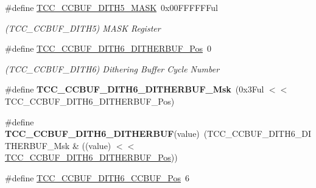 \begin{DoxyCompactItemize}
\item 
\hypertarget{group___s_a_m_l21___t_c_c_ga7bfedfc3944d42a6c27c8d35c3337223}{}\#define \hyperlink{group___s_a_m_l21___t_c_c_ga7bfedfc3944d42a6c27c8d35c3337223}{T\+C\+C\+\_\+\+C\+C\+B\+U\+F\+\_\+\+D\+I\+T\+H5\+\_\+\+M\+A\+S\+K}~0x00\+F\+F\+F\+F\+F\+Ful\label{group___s_a_m_l21___t_c_c_ga7bfedfc3944d42a6c27c8d35c3337223}

\begin{DoxyCompactList}\small\item\em (T\+C\+C\+\_\+\+C\+C\+B\+U\+F\+\_\+\+D\+I\+T\+H5) M\+A\+S\+K Register \end{DoxyCompactList}\item 
\hypertarget{group___s_a_m_l21___t_c_c_gaa0f9cd649bfec0986284ae7c3cbba40d}{}\#define \hyperlink{group___s_a_m_l21___t_c_c_gaa0f9cd649bfec0986284ae7c3cbba40d}{T\+C\+C\+\_\+\+C\+C\+B\+U\+F\+\_\+\+D\+I\+T\+H6\+\_\+\+D\+I\+T\+H\+E\+R\+B\+U\+F\+\_\+\+Pos}~0\label{group___s_a_m_l21___t_c_c_gaa0f9cd649bfec0986284ae7c3cbba40d}

\begin{DoxyCompactList}\small\item\em (T\+C\+C\+\_\+\+C\+C\+B\+U\+F\+\_\+\+D\+I\+T\+H6) Dithering Buffer Cycle Number \end{DoxyCompactList}\item 
\hypertarget{group___s_a_m_l21___t_c_c_ga18712c9d6020173747021757a315e85e}{}\#define {\bfseries T\+C\+C\+\_\+\+C\+C\+B\+U\+F\+\_\+\+D\+I\+T\+H6\+\_\+\+D\+I\+T\+H\+E\+R\+B\+U\+F\+\_\+\+Msk}~(0x3\+Ful $<$$<$ T\+C\+C\+\_\+\+C\+C\+B\+U\+F\+\_\+\+D\+I\+T\+H6\+\_\+\+D\+I\+T\+H\+E\+R\+B\+U\+F\+\_\+\+Pos)\label{group___s_a_m_l21___t_c_c_ga18712c9d6020173747021757a315e85e}

\item 
\hypertarget{group___s_a_m_l21___t_c_c_gac284775c8b8a00079d7c709dbaacd784}{}\#define {\bfseries T\+C\+C\+\_\+\+C\+C\+B\+U\+F\+\_\+\+D\+I\+T\+H6\+\_\+\+D\+I\+T\+H\+E\+R\+B\+U\+F}(value)~(T\+C\+C\+\_\+\+C\+C\+B\+U\+F\+\_\+\+D\+I\+T\+H6\+\_\+\+D\+I\+T\+H\+E\+R\+B\+U\+F\+\_\+\+Msk \& ((value) $<$$<$ \hyperlink{group___s_a_m_l21___t_c_c_gaa0f9cd649bfec0986284ae7c3cbba40d}{T\+C\+C\+\_\+\+C\+C\+B\+U\+F\+\_\+\+D\+I\+T\+H6\+\_\+\+D\+I\+T\+H\+E\+R\+B\+U\+F\+\_\+\+Pos}))\label{group___s_a_m_l21___t_c_c_gac284775c8b8a00079d7c709dbaacd784}

\item 
\hypertarget{group___s_a_m_l21___t_c_c_ga8960c366072306d9250f40644a7b77d4}{}\#define \hyperlink{group___s_a_m_l21___t_c_c_ga8960c366072306d9250f40644a7b77d4}{T\+C\+C\+\_\+\+C\+C\+B\+U\+F\+\_\+\+D\+I\+T\+H6\+\_\+\+C\+C\+B\+U\+F\+\_\+\+Pos}~6\label{group___s_a_m_l21___t_c_c_ga8960c366072306d9250f40644a7b77d4}


\end{DoxyCompactItemize}

